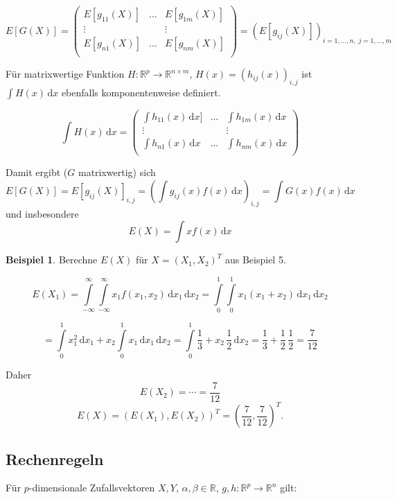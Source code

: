 \documentclass[12pt, a4paper]{article}
\theoremstyle{plain}
\theoremstyle{definition}
\newtheorem{beispiel}[thm]{Beispiel}
\newcommand{\R}{\mathbb{R}}
\newcommand{\1}{\mathds{1}}
\renewcommand{\d}{\,\mathrm{d}}
\begin{document}
\[ E[G(X)] =  \begin{pmatrix}

E[g_{11}(X)]  & \ldots & E[g_{1m}(X)] \\
\vdots & & \vdots \\
E[g_{n1}(X)] & \ldots & E[g_{nm}(X)] \\

\end{pmatrix}  =  (E[g_{ij}(X)])_{i = 1, \dots, n, \; j = 1,\dots, m} \]

Für matrixwertige Funktion $  H: \R^p \to \R^{n\times m}, \, H(x) = (h_{ij}(x))_{i,j} $ ist 
$ \int H(x) \d x  $ ebenfalls komponentenweise definiert.

\[ \int H(x) \d x =   \begin{pmatrix}

\int h_{11}(x) \d x]  & \ldots & \int h_{1m}(x) \d x \\
\vdots & & \vdots \\
\int h_{n1}(x) \d x & \ldots & \int h_{nm}(x) \d x \\

\end{pmatrix}  \]

Damit ergibt ($G$ matrixwertig) sich \[ E[G(X)] = E[g_{ij}(X)]_{i,j} = \left(\int g_{ij}(x)f(x)\d x \right)_{i,j} = \int G(x)f(x) \d x \]
und insbesondere \[  E(X) = \int x f(x) \d x   \]

\begin{beispiel}
Berechne $E(X)$ für $X=(X_1, X_2)^T$ aus Beispiel 5.
\end{beispiel}
\[ E(X_1) = \int\limits_{-\infty}^{\infty} \int\limits_{-\infty}^{\infty} x_1 f(x_1, x_2) \d x_1 \d x_2
 =   \int\limits_{0}^{1} \int\limits_{0}^{1} x_1 (x_1 + x_2) \d x_1 \d x_2  \]
 

 \[=    \int\limits_{0}^{1} x_1^2 \d x_1   + x_2 \int\limits_0^1 x_1 \d x_1 \d x_2
= \int\limits_0^1 \frac{1}{3} + x_2 \, \frac{1}{2} \d x_2 = \frac{1}{3} + \frac{1}{2} \, \frac{1}{2} = \frac{7}{12}\]

Daher \[  E(X_2) = \cdots = \frac{7}{12}    \]
\[ E(X) = (E(X_1), E(X_2))^T = (\frac{7}{12}, \frac{7}{12})^T   . \]

\subsection{Rechenregeln}

Für $p$-dimensionale Zufallsvektoren $X,Y$, $\alpha, \beta \in \R$, $g,h: \R^p \to \R^n$ gilt:
\end{document}
